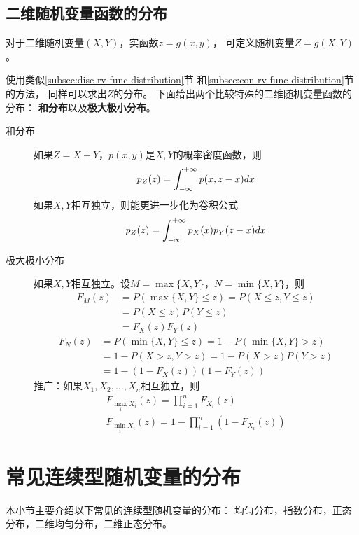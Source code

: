 \subsection{二维随机变量函数的分布}
对于二维随机变量$(X,Y)$，实函数$z=g(x,y)$，
可定义随机变量$Z=g(X,Y)$。

使用类似\ref{subsec:disc-rv-func-distribution}节
和\ref{subsec:con-rv-func-distribution}节的方法，
同样可以求出$Z$的分布。
下面给出两个比较特殊的二维随机变量函数的分布：
\textbf{和分布}以及\textbf{极大极小分布}。

\begin{description}
  \item[和分布]
  如果$Z=X+Y$，$p(x,y)$是$X,Y$的概率密度函数，则
  \begin{displaymath}
    p_Z(z) = \int_{-\infty}^{+\infty} p(x,z-x)dx
  \end{displaymath}
  如果$X,Y$相互独立，则能更进一步化为卷积公式
  \begin{displaymath}
    p_Z(z) = \int_{-\infty}^{+\infty} p_X(x)p_Y(z-x)dx
  \end{displaymath}
  \item[极大极小分布]
  如果$X,Y$相互独立。设$M=\max\{X,Y\}$，$N=\min\{X,Y\}$，则
  \begin{align*}
    F_M(z) &= P(\max\{X,Y\}\le z) = P(X\le z, Y\le z) \\
    &= P(X\le z)P(Y\le z) \\
    &= F_X(z)F_Y(z)
  \end{align*}
  \begin{align*}
    F_N(z) &= P(\min\{X,Y\}\le z) = 1 - P(\min\{X,Y\}>z) \\
    &= 1 - P(X>z,Y>z) = 1 - P(X>z)P(Y>z) \\
    &= 1 - (1-F_X(z))(1-F_Y(z))
  \end{align*}
  推广：如果$X_1,X_2,\dots,X_n$相互独立，则
  \begin{gather*}
    F_{\max_iX_i}(z) = \prod_{i=1}^{n}F_{X_i}(z) \\
    F_{\min_iX_i}(z) = 1-\prod_{i=1}^{n}(1-F_{X_i}(z))
  \end{gather*}
\end{description}

\section{常见连续型随机变量的分布}
本小节主要介绍以下常见的连续型随机变量的分布：
均匀分布，指数分布，正态分布，二维均匀分布，二维正态分布。

